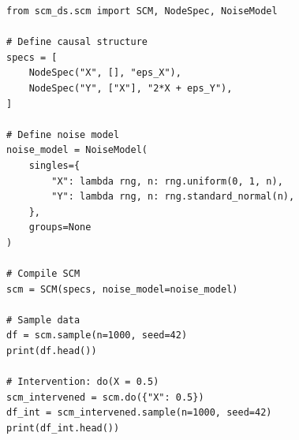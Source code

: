 \documentclass[11pt,a4paper]{article}
\begin{document}
\begin{lstlisting}[caption={Complete Minimal Example}]
from scm_ds.scm import SCM, NodeSpec, NoiseModel

# Define causal structure
specs = [
    NodeSpec("X", [], "eps_X"),
    NodeSpec("Y", ["X"], "2*X + eps_Y"),
]

# Define noise model
noise_model = NoiseModel(
    singles={
        "X": lambda rng, n: rng.uniform(0, 1, n),
        "Y": lambda rng, n: rng.standard_normal(n),
    },
    groups=None
)

# Compile SCM
scm = SCM(specs, noise_model=noise_model)

# Sample data
df = scm.sample(n=1000, seed=42)
print(df.head())

# Intervention: do(X = 0.5)
scm_intervened = scm.do({"X": 0.5})
df_int = scm_intervened.sample(n=1000, seed=42)
print(df_int.head())
\end{lstlisting}
\end{document}
